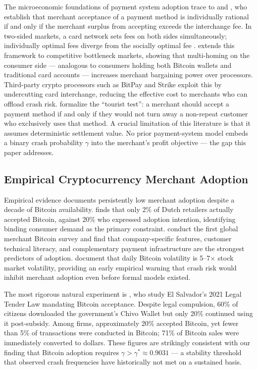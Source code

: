 \documentclass{article}
\begin{document}
The microeconomic foundations of payment system adoption trace to
\citet{rochet2002} and \citet{rochet2003}, who establish that merchant
acceptance of a payment method is individually rational if and only if the
merchant surplus from accepting exceeds the interchange fee.
In two-sided markets, a card network sets fees on both sides simultaneously;
individually optimal fees diverge from the socially optimal fee
\citep{wright2004}.
\citet{armstrong2006} extends this framework to competitive bottleneck markets,
showing that multi-homing on the consumer side --- analogous to consumers holding
both Bitcoin wallets and traditional card accounts --- increases merchant
bargaining power over processors.
Third-party crypto processors such as BitPay and Strike exploit this by
undercutting card interchange, reducing the effective cost to merchants who can
offload crash risk.
\citet{rochet2011} formalize the ``tourist test'': a merchant should accept a
payment method if and only if they would not turn away a non-repeat customer
who exclusively uses that method.
A crucial limitation of this literature is that it assumes deterministic
settlement value.
No prior payment-system model embeds a binary crash probability $\gamma$ into
the merchant's profit objective --- the gap this paper addresses.

\subsection{Empirical Cryptocurrency Merchant Adoption}

Empirical evidence documents persistently low merchant adoption despite a decade
of Bitcoin availability.
\citet{jonker2019} finds that only 2\% of Dutch retailers actually accepted
Bitcoin, against 20\% who expressed adoption intention, identifying binding
consumer demand as the primary constraint.
\citet{polasik2015} conduct the first global merchant Bitcoin survey and find
that company-specific features, customer technical literacy, and complementary
payment infrastructure are the strongest predictors of adoption.
\citet{bohme2015} document that daily Bitcoin volatility is 5--7$\times$ stock
market volatility, providing an early empirical warning that crash risk would
inhibit merchant adoption even before formal models existed.

The most rigorous natural experiment is \citet{alvarez2023}, who study El
Salvador's 2021 Legal Tender Law mandating Bitcoin acceptance.
Despite legal compulsion, 60\% of citizens downloaded the government's Chivo
Wallet but only 20\% continued using it post-subsidy.
Among firms, approximately 20\% accepted Bitcoin, yet fewer than 5\% of
transactions were conducted in Bitcoin; 71\% of Bitcoin sales were immediately
converted to dollars.
These figures are strikingly consistent with our finding that Bitcoin adoption
requires $\gamma > \gamma^* \approx 0.9031$ --- a stability threshold that
observed crash frequencies have historically not met on a sustained basis.
\end{document}

